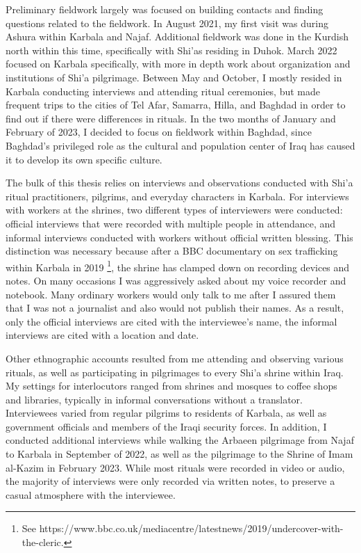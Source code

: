 Preliminary fieldwork largely was focused on building contacts and finding questions related to the fieldwork. In August 2021, my first visit was during Ashura within Karbala and Najaf. Additional fieldwork was done in the Kurdish north within this time, specifically with Shi'as residing in Duhok. March 2022 focused on Karbala specifically, with more in depth work about organization and institutions of Shi'a pilgrimage. Between May and October, I mostly resided in Karbala conducting interviews and attending ritual ceremonies, but made frequent trips to the cities of Tel Afar, Samarra, Hilla, and Baghdad in order to find out if there were differences in rituals. In the two months of January and February of 2023, I decided to focus on fieldwork within Baghdad, since Baghdad's privileged role as the cultural and population center of Iraq has caused it to develop its own specific culture. 

The bulk of this thesis relies on interviews and observations conducted with Shi'a ritual practitioners, pilgrims, and everyday characters in Karbala. For interviews with workers at the shrines, two different types of interviewers were conducted: official interviews that were recorded with multiple people in attendance, and informal interviews conducted with workers without official written blessing. This distinction was necessary because after a BBC documentary on sex trafficking within Karbala in 2019 \footnote{See https://www.bbc.co.uk/mediacentre/latestnews/2019/undercover-with-the-cleric.}, the shrine has clamped down on recording devices and notes. On many occasions I was aggressively asked about my voice recorder and notebook. Many ordinary workers would only talk to me after I assured them that I was not a journalist and also would not publish their names. As a result, only the official interviews are cited with the interviewee's name, the informal interviews are cited with a location and date. 

Other ethnographic accounts resulted from me attending and observing various rituals, as well as participating in pilgrimages to every Shi'a shrine within Iraq. My settings for interlocutors ranged from shrines and mosques to coffee shops and libraries, typically in informal conversations without a translator. Interviewees varied from regular pilgrims to residents of Karbala, as well as government officials and members of the Iraqi security forces. In addition, I conducted additional interviews while walking the Arbaeen pilgrimage from Najaf to Karbala in September of 2022, as well as the pilgrimage to the Shrine of Imam al-Kazim in February 2023. While most rituals were recorded in video or audio, the majority of interviews were only recorded via written notes, to preserve a casual atmosphere with the interviewee. 

